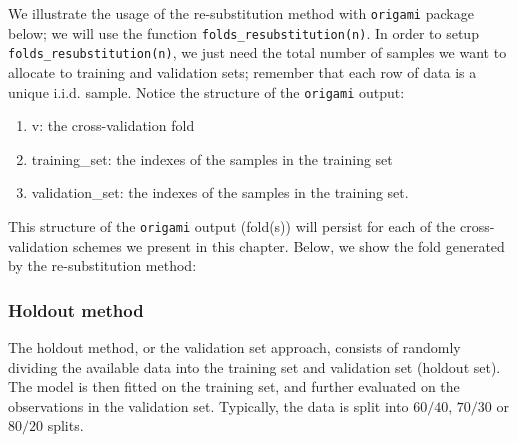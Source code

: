 \documentclass[12pt, krantz2,]{book}
\newenvironment{Shaded}{\begin{snugshade}}{\end{snugshade}}
\newcommand{\CommentTok}[1]{\textcolor[rgb]{0.56,0.35,0.01}{\textit{#1}}}
\newcommand{\KeywordTok}[1]{\textcolor[rgb]{0.13,0.29,0.53}{\textbf{#1}}}
\newcommand{\NormalTok}[1]{#1}
\providecommand{\tightlist}{%
  \setlength{\itemsep}{0pt}\setlength{\parskip}{0pt}}
\theoremstyle{definition}
\theoremstyle{definition}
\theoremstyle{definition}
\newcommand{\1}{\mathbbm{1}}
\begin{document}
We illustrate the usage of the re-substitution method with \texttt{origami} package
below; we will use the function \texttt{folds\_resubstitution(n)}. In order to setup
\texttt{folds\_resubstitution(n)}, we just need the total number of samples we want to
allocate to training and validation sets; remember that each row of data is a
unique i.i.d. sample. Notice the structure of the \texttt{origami} output:

\begin{enumerate}
\def\labelenumi{\arabic{enumi}.}
\tightlist
\item
  v: the cross-validation fold
\item
  training\_set: the indexes of the samples in the training set
\item
  validation\_set: the indexes of the samples in the training set.
\end{enumerate}

This structure of the \texttt{origami} output (fold(s)) will persist for each of the
cross-validation schemes we present in this chapter. Below, we show the fold
generated by the re-substitution method:

\begin{Shaded}
\end{Shaded}

\hypertarget{holdout-method}{%
\subsubsection{Holdout method}\label{holdout-method}}

The holdout method, or the validation set approach, consists of randomly
dividing the available data into the training set and validation set (holdout
set). The model is then fitted on the training set, and further evaluated on
the observations in the validation set. Typically, the data is split into
\(60/40\), \(70/30\) or \(80/20\) splits.
\end{document}
